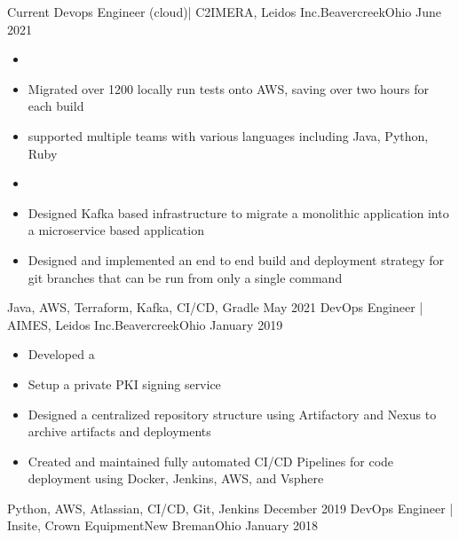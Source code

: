 %
%
%
\begin{experiences}

  \experience
    {Current}   {Devops Engineer (cloud)| C2IMERA, Leidos Inc.}{Beavercreek}{Ohio}
    {June 2021} {
                      \begin{itemize}
                        \item
                        \item Migrated over 1200 locally run tests onto AWS, saving over two hours for each build
                        \item supported multiple teams with various languages including Java, Python, Ruby
                        \item
                        \item Designed Kafka based infrastructure to migrate a monolithic application into a microservice based application
                        \item Designed and implemented an end to end build and deployment strategy for git branches that can be run from only a single command

                      \end{itemize}
                    }
                    {Java, AWS, Terraform, Kafka, CI/CD, Gradle}
  \emptySeparator
  \experience
    {May 2021}   {DevOps Engineer | AIMES, Leidos Inc.}{Beavercreek}{Ohio}
    {January 2019} {
                      \begin{itemize}
                          \item Developed a
                          \item Setup a private PKI signing service
                          \item Designed a centralized repository structure using Artifactory and Nexus to archive artifacts and deployments
                          \item Created and maintained fully automated CI/CD Pipelines for code deployment using Docker, Jenkins, AWS, and Vsphere
                      \end{itemize}
                    }
                    {Python, AWS, Atlassian, CI/CD, Git, Jenkins}
  \emptySeparator
  \experience
    {December 2019}   {DevOps Engineer | Insite, Crown Equipment}{New Breman}{Ohio}
    {January 2018} {
                      \begin{itemize}
                        

\end{itemize}}
\end{experiences}
